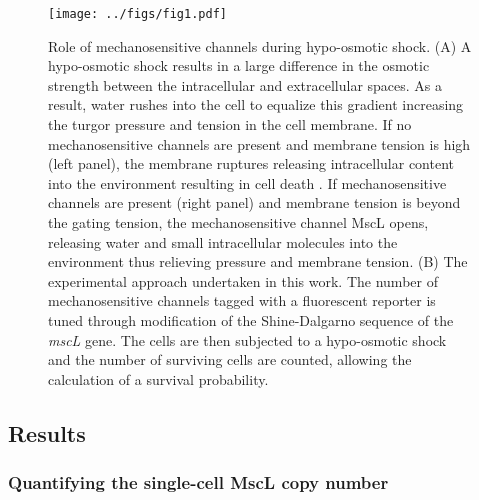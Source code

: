 \begin{figure}
\centering
\texttt{[image: ../figs/fig1.pdf]}
\caption{Role
of
mechanosensitive
channels
during
hypo-osmotic
shock.
(A) A
hypo-osmotic
shock
results
in a
large
difference
in the
osmotic
strength
between
the
intracellular
and
extracellular
spaces.
As a
result,
water
rushes
into
the
cell
to
equalize
this
gradient
increasing
the
turgor
pressure
and
tension
in the
cell
membrane.
If no
mechanosensitive
channels
are
present
and
membrane
tension
is
high
(left
panel),
the
membrane
ruptures
releasing
intracellular
content
into
the
environment
resulting
in
cell
death
. If
mechanosensitive
channels
are
present
(right
panel)
and
membrane
tension
is
beyond
the
gating
tension,
the
mechanosensitive
channel
MscL
opens,
releasing
water
and
small
intracellular
molecules
into
the
environment
thus
relieving
pressure
and
membrane
tension.
(B)
The
experimental
approach
undertaken
in
this
work.
The
number
of
mechanosensitive
channels
tagged
with a
fluorescent
reporter
is
tuned
through
modification
of the
Shine-Dalgarno
sequence
of the
\emph{mscL}
gene.
The
cells
are
then
subjected
to a
hypo-osmotic
shock
and
the
number
of
surviving
cells
are
counted,
allowing
the
calculation
of a
survival
probability.}\label{fig:overview}
\end{figure}

\subsection{Results}\label{results}

\subsubsection{Quantifying
the
single-cell
MscL
copy
number}\label{quantifying-the-single-cell-mscl-copy-number}

